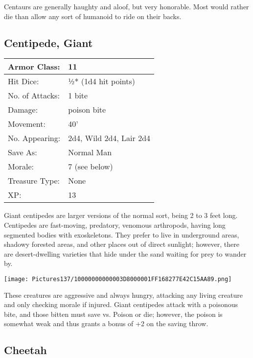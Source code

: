 \documentclass[a4paper,twoside,openany,10pt]{book}
\begin{document}
\begin{multicols}{2}
Centaurs are generally haughty and aloof, but very honorable. Most would rather die than allow any sort of humanoid to ride on their backs.


\subsection*{Centipede, Giant}\label{centipede-giant}

\begin{tabularx}{0.48\textwidth}{@{}lX@{}}
Armor Class: & 11 \\\hline
Hit Dice: & ½* (1d4 hit points) \\\hline
No. of Attacks: & 1 bite \\\hline
Damage: & poison bite \\\hline
Movement: & 40' \\\hline
No. Appearing: & 2d4, Wild 2d4, Lair 2d4 \\\hline
Save As: & Normal Man \\\hline
Morale: & 7 (see below) \\\hline
Treasure Type: & None \\\hline
XP: & 13 \\\hline
\end{tabularx}\medskip

Giant centipedes are larger versions of the normal sort, being 2 to 3 feet long. Centipedes are fast-moving, predatory, venomous arthropods, having long segmented bodies with exoskeletons. They prefer to live in underground areas, shadowy forested areas, and other places out of direct sunlight; however, there are desert-dwelling varieties that hide under the sand waiting for prey to wander by.


\begin{center}
	\texttt{[image: Pictures137/10000000000003D8000001FF168277E42C15AA89.png]}
\end{center}

These creatures are aggressive and always hungry, attacking any living creature and only checking morale if injured. Giant centipedes attack with a poisonous bite, and those bitten must save vs. Poison or die; however, the poison is somewhat weak and thus grants a bonus of +2 on the saving throw.


\subsection*{Cheetah}\label{cheetah}


\end{multicols}
\end{document}
